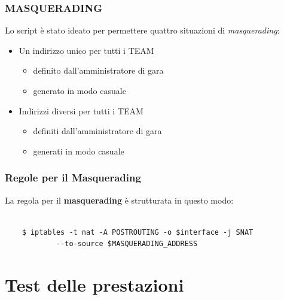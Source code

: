 \documentclass{beamer}
\begin{document}
\begin{frame}
    \frametitle{MASQUERADING}
    Lo script è stato ideato per permettere quattro situazioni di \textit{masquerading}:
    \begin{itemize}
        \item <1-> Un indirizzo unico per tutti i TEAM
        \begin{itemize}
            \item<2-> definito dall'amministratore di gara
            \item<3-> generato in modo casuale
        \end{itemize}
        \item<4-> Indirizzi diversi per tutti i TEAM
        \begin{itemize}
            \item <5-> definiti dall'amministratore di gara
            \item <6-> generati in modo casuale
        \end{itemize}
    \end{itemize}
\end{frame}

\begin{frame}[fragile]
    \frametitle{Regole per il Masquerading}

    La regola per il \textbf{masquerading} è strutturata in questo modo:
    \\~\\
    \begin{lstlisting}
    $ iptables -t nat -A POSTROUTING -o $interface -j SNAT 
            --to-source $MASQUERADING_ADDRESS
    \end{lstlisting}
\end{frame}





\section{Test delle prestazioni}
\begin{frame}
    \frametitle{}

    

\end{frame}
\end{document}
